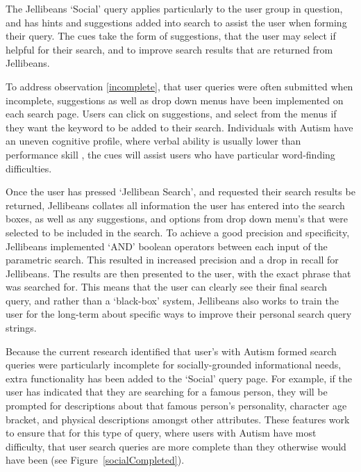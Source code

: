 \documentclass[a4paper, 11pt]{article}
\begin{document}
\vspace{5mm} %

The Jellibeans `Social' query applies particularly to the user group in question, and has hints and suggestions added into search to assist the user when forming their query. The cues take the form of suggestions, that the user may select if helpful for their search, and to improve search results that are returned from Jellibeans.

\vspace{5mm} %
To address observation \ref{incomplete}, that user queries were often submitted when incomplete, suggestions as well as drop down menus have been implemented on each search page. Users can click on suggestions, and select from the menus if they want the keyword to be added to their search. Individuals with Autism have an uneven cognitive profile, where verbal ability is usually lower than performance skill \cite{DSM}, the cues will assist users who have particular word-finding difficulties.


\vspace{5mm}
Once the user has pressed `Jellibean Search', and requested their search results be returned, Jellibeans collates all information the user has entered into the search boxes, as well as any suggestions, and options from drop down menu's that were selected to be included in the search. To achieve a good precision and specificity, Jellibeans implemented `AND' boolean operators between each input of the parametric search. This resulted in increased precision and a drop in recall for Jellibeans. The results are then presented to the user, with the exact phrase that was searched for. This means that the user can clearly see their final search query, and rather than a `black-box' system, Jellibeans also works to train the user for the long-term about specific ways to improve their personal search query strings. 

 \vspace{5mm}
 Because the current research identified that user's with Autism formed search queries were particularly incomplete for socially-grounded informational needs, extra functionality has been added to the `Social' query page. For example, if the user has indicated that they are searching for a famous person, they will be prompted for descriptions about that famous person's personality, character age bracket, and physical descriptions amongst other attributes. These features work to ensure that for this type of query, where users with Autism have most difficulty, that user search queries are more complete than they otherwise would have been (see Figure~\ref{socialCompleted}).
\end{document}
